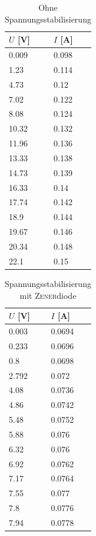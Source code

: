 \documentclass[a4paper,10pt]{article}
\numberwithin{equation}{section}
\begin{document}
\begin{table}
        \centering
\begin{tabular}{ ll }
        $U$ [V] & $I$ [A]\\
	\hline
	 0.009  &  0.098 \\
	 1.23  &  0.114 \\
	 4.73  &  0.12 \\
	 7.02  &  0.122 \\
	 8.08  &  0.124 \\
	 10.32  &  0.132 \\
	 11.96  &  0.136 \\
	 13.33  &  0.138 \\
	 14.73  &  0.139 \\
	 16.33  &  0.14 \\
	 17.74  &  0.142 \\
	 18.9  &  0.144 \\
	 19.67  &  0.146 \\
	 20.34  &  0.148 \\
	 22.1  &  0.15
\end{tabular}
        \caption{Ohne Spannungsstabilisierung}
\end{table}
\begin{table}
        \centering
\begin{tabular}{ ll }
        $U$ [V] & $I$ [A]\\
	\hline
	 0.003  &  0.0694 \\
	 0.233  &  0.0696 \\
	 0.8  &  0.0698 \\
	 2.792  &  0.072 \\
	 4.08  &  0.0736 \\
	 4.86  &  0.0742 \\
	 5.48  &  0.0752 \\
	 5.88  &  0.076 \\
	 6.32  &  0.076 \\
	 6.92  &  0.0762 \\
	 7.17  &  0.0764 \\
	 7.55  &  0.077 \\
	 7.8  &  0.0776 \\
	 7.94  &  0.0778
\end{tabular}
        \caption{Spannungsstabilisierung mit \textsc{Zener}diode}
\end{table}


\end{document}
